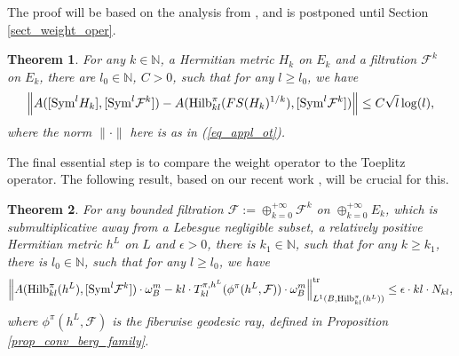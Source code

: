 \documentclass[12pt]{article}
\numberwithin{equation}{section}
\theoremstyle{theorem}
\newtheorem{thm}{Theorem}[section]
\theoremstyle{definition}
\theoremstyle{remark}
\newcommand{\nat}{\mathbb{N}}
\begin{document}
	The proof will be based on the analysis from \cite{FinSubmToepl}, and is postponed until Section \ref{sect_weight_oper}.
	\begin{thm}\label{thm_compat_approx_sol1}
		For any $k \in \nat$, a Hermitian metric $H_k$ on $E_k$ and a filtration $\mathcal{F}^k$ on $E_k$, there are $l_0 \in \nat$, $C > 0$, such that for any $l \geq l_0$, we have
		\begin{equation}
			\Big\|
				A([{\rm{Sym}}^l H_k], [{\rm{Sym}}^l \mathcal{F}^k])
				-
				A({\rm{Hilb}}_{kl}^{\pi}(FS(H_k)^{1/k}), [{\rm{Sym}}^l \mathcal{F}^k])
			\Big\|
			\leq
			C \sqrt{l} \log(l),
		\end{equation}
		where the norm $\| \cdot \|$ here is as in (\ref{eq_appl_ot}).
	\end{thm}
	\par 
	The final essential step is to compare the weight operator to the Toeplitz operator.
	The following result, based on our recent work \cite{FinSubmToepl}, will be crucial for this.
	\begin{thm}\label{thm_compat_approx_sol2}
		For any bounded filtration $\mathcal{F} := \oplus_{k = 0}^{+ \infty} \mathcal{F}^{k}$ on $\oplus_{k = 0}^{+ \infty} E_k$, which is submultiplicative away from a Lebesgue negligible subset, a relatively positive Hermitian metric $h^L$ on $L$ and $\epsilon > 0$, there is $k_1 \in \nat$, such that for any $k \geq k_1$, there is $l_0 \in \nat$, such that for any $l \geq l_0$, we have
		\begin{equation}
			\Big\|
				A({\rm{Hilb}}_{kl}^{\pi}(h^L), [{\rm{Sym}}^l \mathcal{F}^{k}])
				\cdot \omega_B^m
				-
				kl
				\cdot
				T_{kl}^{\pi, h^L}(\phi^{\pi}(h^L, \mathcal{F}))
				\cdot \omega_B^m
			\Big\|_{L^1(B, {\rm{Hilb}}_{kl}^{\pi}(h^L))}^{{\rm{tr}}}
			\leq
			\epsilon \cdot kl \cdot N_{kl},
		\end{equation}
		where $\phi^{\pi}(h^L, \mathcal{F})$ is the fiberwise geodesic ray, defined in Proposition \ref{prop_conv_berg_family}.
	\end{thm}
	\par 
	
\end{document}
